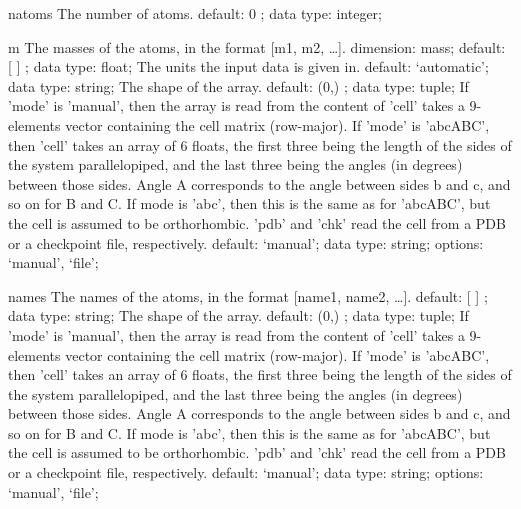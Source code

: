 \begin{ipifield}{}
\begin{ipifield}{natoms}
{The number of atoms.}%
{default:  0 ; data type: integer; }%
{}
\end{ipifield}
\begin{ipifield}{m}%
{The masses of the atoms, in the format [m1, m2, \ldots  ].}%
{dimension: mass; default:  [ ] ; data type: float; }%
{%
{The units the input data is given in.}%
{default: `automatic'; data type: string; }%
%
{The shape of the array.}%
{default:  (0,) ; data type: tuple; }%
%
{If 'mode' is 'manual', then the array is read from the content of 'cell' takes a 9-elements vector containing the cell matrix (row-major). If 'mode' is 'abcABC', then 'cell' takes an array of 6 floats, the first three being the length of the sides of the system parallelopiped, and the last three being the angles (in degrees) between those sides. Angle A corresponds to the angle between sides b and c, and so on for B and C. If mode is 'abc', then this is the same as for 'abcABC', but the cell is assumed to be orthorhombic. 'pdb' and 'chk' read the cell from a PDB or a checkpoint file, respectively.}%
{default: `manual'; data type: string; options: `manual', `file'; }%
}
\end{ipifield}
\begin{ipifield}{names}%
{The names of the atoms, in the format [name1, name2, \ldots  ].}%
{default:  [ ] ; data type: string; }%
{%
{The shape of the array.}%
{default:  (0,) ; data type: tuple; }%
%
{If 'mode' is 'manual', then the array is read from the content of 'cell' takes a 9-elements vector containing the cell matrix (row-major). If 'mode' is 'abcABC', then 'cell' takes an array of 6 floats, the first three being the length of the sides of the system parallelopiped, and the last three being the angles (in degrees) between those sides. Angle A corresponds to the angle between sides b and c, and so on for B and C. If mode is 'abc', then this is the same as for 'abcABC', but the cell is assumed to be orthorhombic. 'pdb' and 'chk' read the cell from a PDB or a checkpoint file, respectively.}%
{default: `manual'; data type: string; options: `manual', `file'; }%
}
\end{ipifield}
\end{ipifield}
